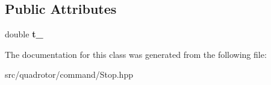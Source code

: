\subsection*{\-Public \-Attributes}
\begin{DoxyCompactItemize}
\item 
\hypertarget{classCommand_1_1Stop_1_1Time_aad1dfd6b50c86d229b591fd0315b3727}{double {\bfseries t\-\_\-}}\label{classCommand_1_1Stop_1_1Time_aad1dfd6b50c86d229b591fd0315b3727}

\end{DoxyCompactItemize}


\-The documentation for this class was generated from the following file\-:\begin{DoxyCompactItemize}
\item 
src/quadrotor/command/\-Stop.\-hpp\end{DoxyCompactItemize}
